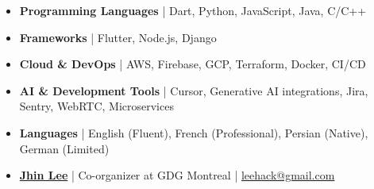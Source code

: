 \documentclass[letterpaper,11pt]{article}
\begin{document}
\begin{itemize}[leftmargin=*, noitemsep, topsep=0pt, partopsep=0pt]
      \item
            \textbf{Programming Languages} | Dart, Python, JavaScript, Java, C/C++

      \item \BigGap
            \textbf{Frameworks} | Flutter, Node.js, Django

      \item \BigGap
            \textbf{Cloud \& DevOps} | AWS, Firebase, GCP, Terraform, Docker, CI/CD

      \item \BigGap
            \textbf{AI \& Development Tools} | Cursor, Generative AI integrations, Jira, Sentry, WebRTC, Microservices

      \item \BigGap
            \textbf{Languages} | English (Fluent), French (Professional), Persian (Native), German (Limited)

\end{itemize}




\begin{itemize}[leftmargin=*, noitemsep, topsep=0pt, partopsep=0pt]
      \item
            \href{https://linkedin.com/in/leehack}
            {\textbf{Jhin Lee}} | Co-organizer at GDG Montreal | \href{mailto:leehack@gmail.com}{leehack@gmail.com}

\end{itemize}
\end{document}
